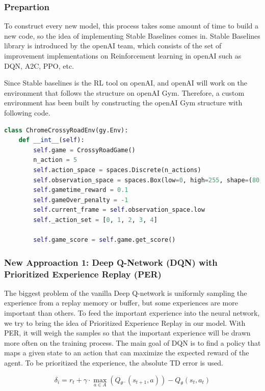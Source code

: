 \documentclass{article}
\begin{document}
\subsubsection{Prepartion}
To construct every new model, this process takes some amount of time to build a new code, so the idea of implementing Stable Baselines comes in. Stable Baselines library is introduced by the openAI team, which consists of the set of improvement implementations on Reinforcement learning in openAI such as DQN, A2C, PPO, etc. \par 

Since Stable baselines is the RL tool on openAI, and openAI will work on the environment that follows the structure on openAI Gym. Therefore, a custom environment has been built by constructing the openAI Gym structure with following code. 

\begin{lstlisting}[language = Python]
class ChromeCrossyRoadEnv(gy.Env):
    def __int__(self):
        self.game = CrossyRoadGame()
        n_action = 5
        self.action_space = spaces.Discrete(n_actions)
        self.observation_space = spaces.Box(low=0, high=255, shape=(80, 80), dtype=np.uint8)
        self.gametime_reward = 0.1
        self.gameOver_penalty = -1
        self.current_frame = self.observation_space.low
        self._action_set = [0, 1, 2, 3, 4]

        self.game_score = self.game.get_score()
\end{lstlisting}

\subsubsection{New Approaction 1: Deep Q-Network (DQN) with Prioritized Experience Replay (PER)}
The biggest problem of the vanilla Deep Q-network is uniformly sampling the experience from a replay memory or buffer, but some experiences are more important than others. To feed the important experience into the neural network, we try to bring the idea of Prioritized Experience Replay in our model. With PER, it will weigh the samples so that the important experience will be drawn more often on the training process.  The main goal of DQN is to find a policy that maps a given state to an action that can maximize the expected reward of the agent. To be prioritized the experience, the absolute TD error is used.

$$\delta_i = r_t + \gamma \cdot \max_{a \in A} (Q_{\theta^-}(s_{t + 1}, a)) - Q_{\theta}(s_t, a_t)$$
\end{document}
